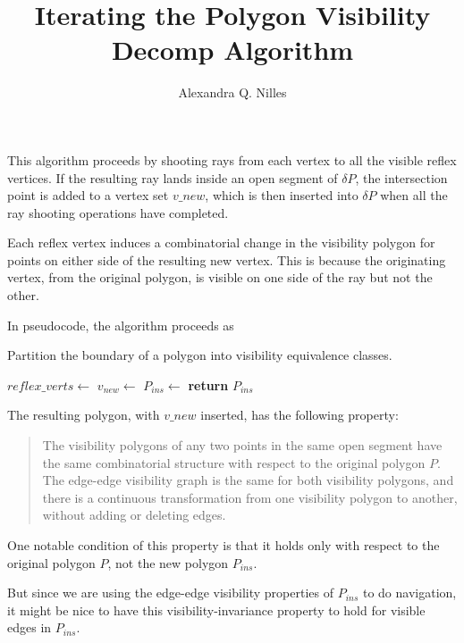 \documentclass[]{article}  %
\title{Iterating the Polygon Visibility Decomp Algorithm}
\author{Alexandra Q. Nilles%
}
\begin{document}
This algorithm proceeds by shooting rays from each vertex to all the visible
reflex vertices. If the resulting ray lands inside an open segment of $\delta
P$, the intersection point is added to a vertex set $v\_new$, which is then
inserted into $\delta P$ when all the ray shooting operations have completed.

Each reflex vertex induces a combinatorial change in the
visibility polygon for points on either side of the resulting new vertex. This
is because the originating vertex, from the original polygon, is visible on one
side of the ray but not the other.

In pseudocode, the algorithm proceeds as

\begin{algorithm}
\caption{Partition the boundary of a polygon into visibility
equivalence classes.}
\label{algo:insert}
\begin{algorithmic}
\State $reflex\_verts \gets$ 
     
        \State $v_{new} \gets$ 
    \EndFor
\EndFor
\State $P_{ins} \gets$ 
\State \textbf{return} $P_{ins}$
\EndProcedure
\end{algorithmic}
\end{algorithm}

The resulting polygon, with $v\_new$ inserted, has the following property:

\begin{quotation}

The visibility polygons of any two points in the same open segment have the same
combinatorial structure with respect to the original polygon $P$. The edge-edge
visibility graph is the same for both visibility polygons, and there is a
continuous transformation from one visibility polygon to another, without
adding or deleting edges.

\end{quotation}

One notable condition of this property is that it holds only with respect to the
original polygon $P$, not the new polygon $P_{ins}$.

But since we are using the edge-edge visibility properties of $P_{ins}$ to do
navigation, it might be nice to have this visibility-invariance property to hold
for visible edges in $P_{ins}$.
\end{document}
